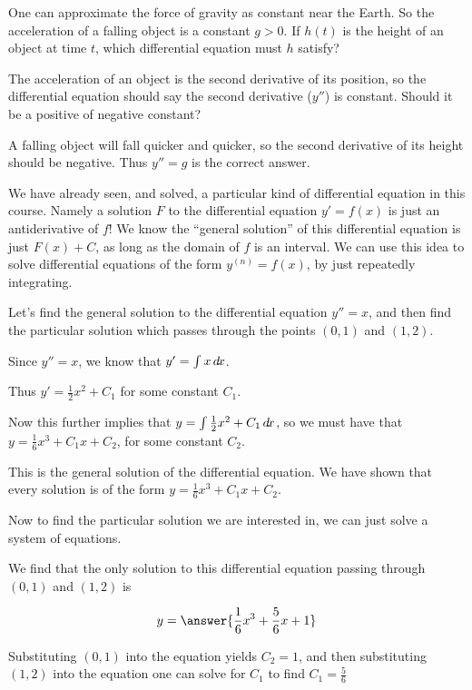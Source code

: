 \documentclass{ximera}
\begin{document}
\begin{question}
  One can approximate the force of gravity as constant near the Earth.
  So the acceleration of a falling object is a constant $g>0$.  If
  $h(t)$ is the height of an object at time $t$, which differential
  equation must $h$ satisfy?
  \begin{multipleChoice}
  \end{multipleChoice}
  
  \begin{hint}
    The acceleration of an object is the second derivative of its
    position, so the differential equation should say the second
    derivative ($y''$) is constant.  Should it be a positive of
    negative constant?
  \end{hint}
  \begin{hint}
    A falling object will fall quicker and quicker, so the second
    derivative of its height should be negative.  Thus $y''=g$ is the
    correct answer.
  \end{hint}	
\end{question}

We have already seen, and solved, a particular kind of differential
equation in this course.  Namely a solution $F$ to the differential
equation $y' = f(x)$ is just an antiderivative of $f$!  We know the
``general solution'' of this differential equation is just $F(x)+C$,
as long as the domain of $f$ is an interval.  We can use this idea to
solve differential equations of the form $y^{(n)} = f(x)$, by just
repeatedly integrating.

\begin{example}
  Let's find the general solution to the differential equation $y'' =
  x$, and then find the particular solution which passes through the
  points $(0,1)$ and $(1,2)$.
  
  Since $y'' = x$, we know that $y' = \int x \mathop{}\!d\! x$. 
  
  Thus $y' = \frac{1}{2} x^2 + C_1$ for some constant $C_1$.  
  
  Now this further implies that $y = \int \frac{1}{2} x^2 + C_1 \mathop{}\!d\! x$, so 
  we must have that $y = \frac{1}{6}x^3+C_1x+C_2$, for some constant $C_2$.
  
  This is the general solution of the differential equation.  We have shown that every solution is of the form $y = \frac{1}{6}x^3+C_1x+C_2$.
  
  Now to find the particular solution we are interested in, we can just solve a system of equations.
  
  We find that the only solution to this differential equation passing through $(0,1)$ and $(1,2)$ is 
  
  \[
  y = \answer{\frac{1}{6}x^3+\frac{5}{6}x+1}
  \]
  
  \begin{hint}
    Substituting $(0,1)$ into the equation yields $C_2 = 1$, and then
    substituting $(1,2)$ into the equation one can solve for $C_1$ to
    find $C_1 = \frac{5}{6}$
  \end{hint}
  
  
\end{example}
\end{document}
